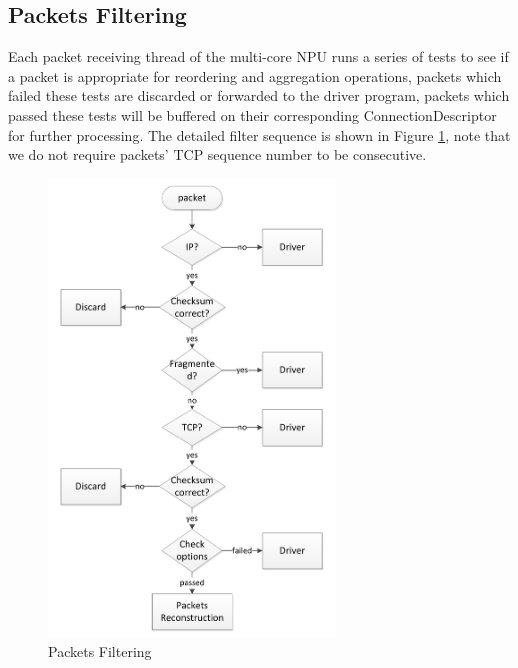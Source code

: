 \documentclass[conference]{IEEEtran}
\begin{document}
\subsection{Packets Filtering}
Each packet receiving thread of the multi-core NPU runs a series of tests to see if a packet is appropriate for reordering and aggregation operations, packets which failed these tests are discarded or forwarded to the driver program, packets which passed these tests will be buffered on their corresponding ConnectionDescriptor for further processing. The detailed filter sequence is shown in Figure \ref{packets filtering}, note that we do not require packets' TCP sequence number to be consecutive.
\begin{figure}[!t]
\centering
\includegraphics[width=3.0in]{filter_packets}
\caption{Packets Filtering}
\label{packets filtering}
\end{figure}
\end{document}
